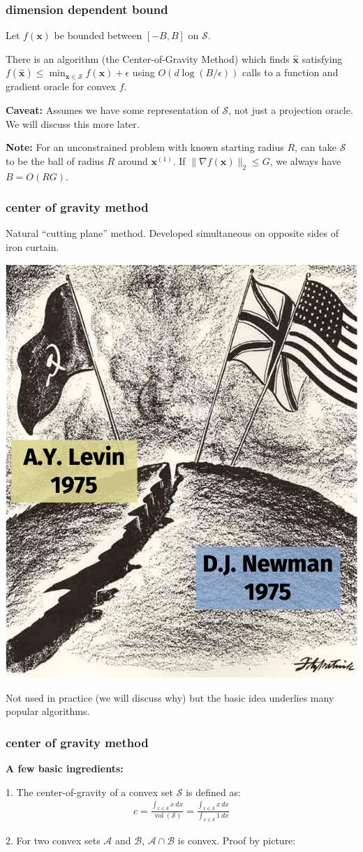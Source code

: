 \documentclass[compress]{beamer}
\newcommand{\bv}[1]{\mathbf{#1}}
\DeclareMathOperator{\vol}{vol}
\begin{document}
\begin{frame}[t]
	\frametitle{dimension dependent bound}	
	Let $f(\bv{x})$ be bounded between $[-B, B]$ on $\mathcal{S}$. 
	\begin{theorem}
		There is an algorithm (the Center-of-Gravity Method) which finds $\hat{\bv{x}}$ satisfying $f(\hat{\bv{x}}) \leq \min_{\bv{x}\in \mathcal{S}}f(\bv{x})+\epsilon$  using $O(d\log(B/\epsilon))$ calls to a function and gradient oracle for convex $f$.
	\end{theorem}
	\textbf{Caveat:} Assumes we have some representation of $\mathcal{S}$, not just a projection oracle. We will discuss this more later.
	
	\textbf{Note:} For an unconstrained problem with known starting radius $R$, can take $\mathcal{S}$ to be the ball of radius $R$ around $\bv{x}^{(1)}$. If $\|\nabla f(\bv{x})\|_2 \leq G$, we always have $B = O(R G)$. 
	
\end{frame}

\begin{frame}[t]
	\frametitle{center of gravity method}
	\begin{center}
		Natural ``cutting plane'' method. Developed simultaneous on opposite sides of iron curtain.
	\end{center}
\begin{center}
	\includegraphics[width=.4\textwidth]{cog_proof.png}
\end{center}

\vspace{-.5em}
Not used in practice (we will discuss why) but the basic idea underlies many popular algorithms.
\end{frame}

\begin{frame}[t]
	\frametitle{center of gravity method}
	\textbf{A few basic ingredients:}

	1. The center-of-gravity of a convex set $\mathcal{S}$ is defined as:
	\begin{align*}
		c = \frac{\int_{x\in \mathcal{S}} x\, dx}{\vol(\mathcal{S})} =  \frac{\int_{x\in \mathcal{S}} x\, dx}{\int_{x\in \mathcal{S}} 1\, dx}
	\end{align*}

	2. For two convex sets $\mathcal{A}$ and $\mathcal{B}$, $\mathcal{A}\cap \mathcal{B}$ is convex. Proof by picture:
\end{frame}
\end{document}
